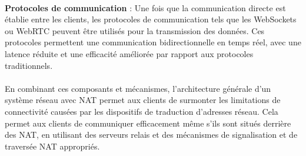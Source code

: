 \paragraph{}
\textbf{Protocoles de communication} : Une fois que la communication directe est établie entre les clients, les protocoles de communication tels que les WebSockets ou WebRTC peuvent être utilisés pour la 
transmission des données. Ces protocoles permettent une communication bidirectionnelle en temps réel, avec une latence réduite et une efficacité améliorée par rapport aux protocoles traditionnels.

\paragraph{}
En combinant ces composants et mécanismes, l'architecture générale d'un système réseau avec NAT permet aux clients de surmonter les limitations de connectivité causées par les dispositifs de 
traduction d'adresses réseau. Cela permet aux clients de communiquer efficacement même s'ils sont situés derrière des NAT, en utilisant des serveurs relais et des mécanismes de signalisation et de traversée NAT appropriés.




